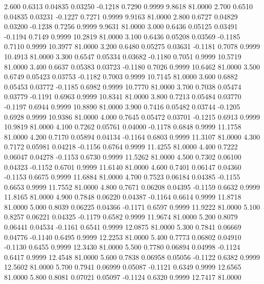    2.600   0.6313   0.04835   0.03250  -0.1218   0.7290   0.9999   9.8618  81.0000
   2.700   0.6510   0.04835   0.03231  -0.1227   0.7271   0.9999   9.9163  81.0000
   2.800   0.6727   0.04829   0.03200  -0.1238   0.7256   0.9999   9.9631  81.0000
   3.000   0.6436   0.05125   0.03491  -0.1194   0.7149   0.9999  10.2819  81.0000
   3.100   0.6436   0.05208   0.03569  -0.1185   0.7110   0.9999  10.3977  81.0000
   3.200   0.6480   0.05275   0.03631  -0.1181   0.7078   0.9999  10.4913  81.0000
   3.300   0.6547   0.05334   0.03682  -0.1180   0.7051   0.9999  10.5719  81.0000
   3.400   0.6637   0.05383   0.03723  -0.1180   0.7026   0.9999  10.6462  81.0000
   3.500   0.6749   0.05423   0.03753  -0.1182   0.7003   0.9999  10.7145  81.0000
   3.600   0.6882   0.05453   0.03772  -0.1185   0.6982   0.9999  10.7770  81.0000
   3.700   0.7038   0.05474   0.03779  -0.1191   0.6963   0.9999  10.8341  81.0000
   3.800   0.7213   0.05484   0.03770  -0.1197   0.6944   0.9999  10.8890  81.0000
   3.900   0.7416   0.05482   0.03744  -0.1205   0.6928   0.9999  10.9386  81.0000
   4.000   0.7645   0.05472   0.03701  -0.1215   0.6913   0.9999  10.9819  81.0000
   4.100   0.7262   0.05761   0.04000  -0.1178   0.6848   0.9999  11.1758  81.0000
   4.200   0.7170   0.05894   0.04134  -0.1164   0.6803   0.9999  11.3107  81.0000
   4.300   0.7172   0.05981   0.04218  -0.1156   0.6764   0.9999  11.4255  81.0000
   4.400   0.7222   0.06047   0.04278  -0.1153   0.6730   0.9999  11.5262  81.0000
   4.500   0.7302   0.06100   0.04323  -0.1152   0.6701   0.9999  11.6140  81.0000
   4.600   0.7401   0.06147   0.04360  -0.1153   0.6675   0.9999  11.6884  81.0000
   4.700   0.7523   0.06184   0.04385  -0.1155   0.6653   0.9999  11.7552  81.0000
   4.800   0.7671   0.06208   0.04395  -0.1159   0.6632   0.9999  11.8165  81.0000
   4.900   0.7848   0.06220   0.04387  -0.1164   0.6614   0.9999  11.8718  81.0000
   5.000   0.8039   0.06225   0.04366  -0.1171   0.6597   0.9999  11.9222  81.0000
   5.100   0.8257   0.06221   0.04325  -0.1179   0.6582   0.9999  11.9674  81.0000
   5.200   0.8079   0.06441   0.04534  -0.1161   0.6541   0.9999  12.0875  81.0000
   5.300   0.7841   0.06669   0.04776  -0.1140   0.6495   0.9999  12.2253  81.0000
   5.400   0.7773   0.06802   0.04910  -0.1130   0.6455   0.9999  12.3430  81.0000
   5.500   0.7780   0.06894   0.04998  -0.1124   0.6417   0.9999  12.4548  81.0000
   5.600   0.7838   0.06958   0.05056  -0.1122   0.6382   0.9999  12.5602  81.0000
   5.700   0.7941   0.06999   0.05087  -0.1121   0.6349   0.9999  12.6565  81.0000
   5.800   0.8081   0.07021   0.05097  -0.1124   0.6320   0.9999  12.7417  81.0000
